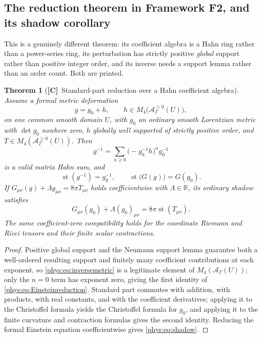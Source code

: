 \documentclass[11pt,letterpaper]{article}
\numberwithin{equation}{section}
\newtheorem{theorem}{Theorem}[section]
\theoremstyle{definition}
\theoremstyle{remark}
\newcommand{\R}{\mathbb R}
\newcommand{\Alg}{\mathcal A}
\DeclareMathOperator{\st}{st}
\newcommand{\TC}{\textcolor{TierC}{\textsf{\bfseries[C]}}}
\begin{document}
\subsection{The reduction theorem in Framework F2, and its shadow corollary}
\label{phys:sub:reduceF2}

This is a genuinely different theorem: its coefficient algebra is a Hahn ring
rather than a power-series ring, its perturbation has strictly positive
\emph{global} support rather than positive integer order, and its inverse
needs a support lemma rather than an order count. Both are printed.

\begin{theorem}[\TC\ Standard-part reduction over a Hahn coefficient algebra]
\label{phys:thm:reduction}
Assume a formal metric deformation
\begin{equation}\label{phys:eq:metricdeformation}
g=g_{0}+h,\qquad h\in M_{4}\bigl(\Alg^{>0}_{\Gamma}(U)\bigr),
\end{equation}
on one common smooth domain $U$, with $g_{0}$ an ordinary smooth Lorentzian
metric with $\det g_{0}$ nowhere zero, $h$ globally well supported of strictly
positive order, and $T\in M_{4}(\Alg^{\ge0}_{\Gamma}(U))$. Then
\begin{equation}\label{phys:eq:inversemetric}
g^{-1}=\sum_{n\ge0}\bigl(-g_{0}^{-1}h\bigr)^{n}g_{0}^{-1}
\end{equation}
is a valid matrix Hahn sum, and
\begin{equation}\label{phys:eq:Einsteinreduction}
\st(g^{-1})=g_{0}^{-1},\qquad \st\bigl(G(g)\bigr)=G(g_{0}).
\end{equation}
If $G_{\mu\nu}(g)+\Lambda g_{\mu\nu}=8\pi T_{\mu\nu}$ holds coefficientwise
with $\Lambda\in\R$, its ordinary shadow satisfies
\begin{equation}\label{phys:eq:shadow}
G_{\mu\nu}(g_{0})+\Lambda(g_{0})_{\mu\nu}=8\pi\st(T_{\mu\nu}).
\end{equation}
The same coefficient-zero compatibility holds for the coordinate Riemann and
Ricci tensors and their finite scalar contractions.
\end{theorem}
\begin{proof}
Positive global support and the Neumann support lemma guarantee both a
well-ordered resulting support and finitely many coefficient contributions at
each exponent, so \eqref{phys:eq:inversemetric} is a legitimate element of
$M_{4}(\Alg_{\Gamma}(U))$; only the $n=0$ term has exponent zero, giving the
first identity of \eqref{phys:eq:Einsteinreduction}. Standard part commutes
with addition, with products, with real constants, and with the coefficient
derivatives; applying it to the Christoffel formula yields the Christoffel
formula for $g_{0}$, and applying it to the finite curvature and contraction
formulas gives the second identity. Reducing the formal Einstein equation
coefficientwise gives \eqref{phys:eq:shadow}.
\end{proof}
\end{document}
